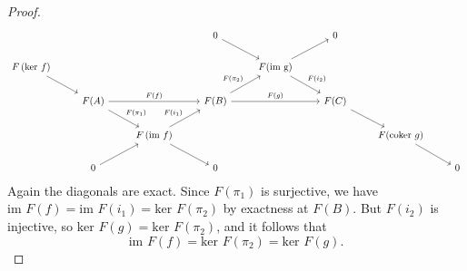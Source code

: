 \begin{proof}
   \[\begin{tikzcd}
	&&& 0 && 0 \\
	   {F\left(\text{ker } f\right)} &&&& {F(\text{im g})} \\
	                                 & {F(A)} && {F(B)} && {F(C)} \\
	                                 && {F\left(\text{im }f\right)} &&&& {F(\text{coker }g)} \\
	                                 & 0 && 0 &&&& 0
	                                 \arrow[from=2-1, to=3-2]
	                                 \arrow["{F(\pi_1)}", from=3-2, to=4-3]
	                                 \arrow[from=4-3, to=5-4]
	                                 \arrow[from=5-2, to=4-3]
	                                 \arrow["{F(i_1)}", from=4-3, to=3-4]
	                                 \arrow["{F(f)}", from=3-2, to=3-4]
	                                 \arrow["{F(g)}", from=3-4, to=3-6]
	                                 \arrow["{F(\pi_2)}", from=3-4, to=2-5]
	                                 \arrow[from=2-5, to=1-6]
	                                 \arrow[from=1-4, to=2-5]
	                                 \arrow["{F(i_2)}", from=2-5, to=3-6]
	                                 \arrow[from=3-6, to=4-7]
	                                 \arrow[from=4-7, to=5-8]
   \end{tikzcd}\]
   Again the diagonals are exact. Since $ F(\pi_1) $ is surjective, we have $ \text{im }F(f) = \text{im }F(i_1) = \text{ker }F(\pi_2) $ by exactness at $ F(B) $. But $ F(i_2) $ is injective, so $ \text{ker }F(g) = \text{ker }F(\pi_2) $, and it follows that
   \begin{equation*}
      \text{im }F(f) = \text{ker }F(\pi_2) = \text{ker }F(g).
   \end{equation*}
 \end{proof}

